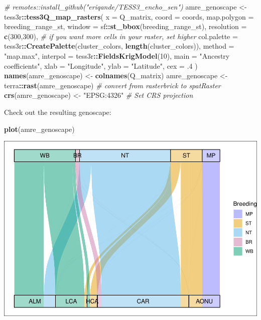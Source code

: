 \documentclass[
]{book}
\newenvironment{Shaded}{\begin{snugshade}}{\end{snugshade}}
\newcommand{\AttributeTok}[1]{\textcolor[rgb]{0.13,0.29,0.53}{#1}}
\newcommand{\CommentTok}[1]{\textcolor[rgb]{0.56,0.35,0.01}{\textit{#1}}}
\newcommand{\DecValTok}[1]{\textcolor[rgb]{0.00,0.00,0.81}{#1}}
\newcommand{\FunctionTok}[1]{\textcolor[rgb]{0.13,0.29,0.53}{\textbf{#1}}}
\newcommand{\NormalTok}[1]{#1}
\newcommand{\OtherTok}[1]{\textcolor[rgb]{0.56,0.35,0.01}{#1}}
\newcommand{\SpecialCharTok}[1]{\textcolor[rgb]{0.81,0.36,0.00}{\textbf{#1}}}
\newcommand{\StringTok}[1]{\textcolor[rgb]{0.31,0.60,0.02}{#1}}
\begin{document}
\begin{Shaded}
\begin{Highlighting}[]
\CommentTok{\# remotes::install\_github("eriqande/TESS3\_encho\_sen")}
\NormalTok{amre\_genoscape }\OtherTok{\textless{}{-}}\NormalTok{ tess3r}\SpecialCharTok{::}\FunctionTok{tess3Q\_map\_rasters}\NormalTok{(}
  \AttributeTok{x =}\NormalTok{ Q\_matrix,}
  \AttributeTok{coord =}\NormalTok{ coords,}
  \AttributeTok{map.polygon =}\NormalTok{ breeding\_range\_st,}
  \AttributeTok{window =}\NormalTok{ sf}\SpecialCharTok{::}\FunctionTok{st\_bbox}\NormalTok{(breeding\_range\_st),}
  \AttributeTok{resolution =} \FunctionTok{c}\NormalTok{(}\DecValTok{300}\NormalTok{,}\DecValTok{300}\NormalTok{), }\CommentTok{\# if you want more cells in your raster, set higher}
  \AttributeTok{col.palette =}\NormalTok{ tess3r}\SpecialCharTok{::}\FunctionTok{CreatePalette}\NormalTok{(cluster\_colors, }\FunctionTok{length}\NormalTok{(cluster\_colors)), }
  \AttributeTok{method =} \StringTok{"map.max"}\NormalTok{, }
  \AttributeTok{interpol =}\NormalTok{ tess3r}\SpecialCharTok{::}\FunctionTok{FieldsKrigModel}\NormalTok{(}\DecValTok{10}\NormalTok{),  }
  \AttributeTok{main =} \StringTok{"Ancestry coefficients"}\NormalTok{,}
  \AttributeTok{xlab =} \StringTok{"Longitude"}\NormalTok{, }
  \AttributeTok{ylab =} \StringTok{"Latitude"}\NormalTok{, }
  \AttributeTok{cex =}\NormalTok{ .}\DecValTok{4}
\NormalTok{)}
\FunctionTok{names}\NormalTok{(amre\_genoscape) }\OtherTok{\textless{}{-}} \FunctionTok{colnames}\NormalTok{(Q\_matrix)}
\NormalTok{amre\_genoscape }\OtherTok{\textless{}{-}}\NormalTok{ terra}\SpecialCharTok{::}\FunctionTok{rast}\NormalTok{(amre\_genoscape) }\CommentTok{\# convert from rasterbrick to spatRaster}
\FunctionTok{crs}\NormalTok{(amre\_genoscape) }\OtherTok{\textless{}{-}} \StringTok{"EPSG:4326"} \CommentTok{\# Set CRS projection}
\end{Highlighting}
\end{Shaded}

Check out the resulting genoscape:

\begin{Shaded}
\begin{Highlighting}[]
\FunctionTok{plot}\NormalTok{(amre\_genoscape)}
\end{Highlighting}
\end{Shaded}

\includegraphics{Mignette_files/figure-latex/unnamed-chunk-24-1.pdf}
\end{document}

